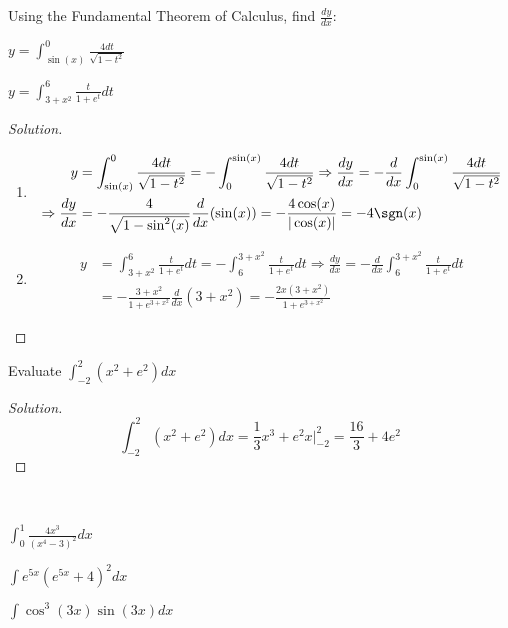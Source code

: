 \documentclass[crop=false,class=article,oneside]{standalone}
\begin{document}
        \begin{problem}
        Using the Fundamental Theorem of Calculus, find $\frac{dy}{dx}$:
        \begin{enumerate}
            \begin{multicols}{2}
                \item $y=\int_{\sin(x)}^{0}\frac{4dt}{\sqrt{1-t^{2}}}$
                \item $y=\int_{3+x^{2}}^{6}\frac{t}{1+e^{t}}dt$
            \end{multicols}
        \end{enumerate}
        \end{problem}
        \begin{proof}[Solution]
        \
        \begin{enumerate}
            \item   \begin{align*}
            y&=\int_{\sin(x)}^{0}\frac{4dt}{\sqrt{1-t^{2}}}=-\int_{0}^{\sin(x)}\frac{4dt}{\sqrt{1-t^{2}}}\Rightarrow\frac{dy}{dx}=-\frac{d}{dx}\int_{0}^{\sin(x)}\frac{4dt}{\sqrt{1-t^{2}}}\\
            \Rightarrow\frac{dy}{dx}&=-\frac{4}{\sqrt{1-\sin^{2}(x)}}\frac{d}{dx}(\sin(x))=-\frac{4\cos(x)}{|\cos(x)|}=-4\sgn(x)
                    \end{align*}
            \item   \begin{align*}
            y&=\int_{3+x^{2}}^{6}\frac{t}{1+e^{t}}dt=-\int_{6}^{3+x^{2}}\frac{t}{1+e^{t}}dt\Rightarrow\frac{dy}{dx}=-\frac{d}{dx}\int_{6}^{3+x^{2}}\frac{t}{1+e^{t}}dt\\
            &=-\frac{3+x^{2}}{1+e^{3+x^{2}}}\frac{d}{dx}(3+x^{2})=-\frac{2x(3+x^{2})}{1+e^{3+x^{2}}}
                    \end{align*}
        \end{enumerate}
        \end{proof}
        \newpage
        \begin{problem}
        Evaluate $\int_{-2}^{2}(x^{2}+e^{2})dx$
        \end{problem}
        \begin{proof}[Solution]
        \begin{equation*}
            \int_{-2}^{2}(x^{2}+e^{2})dx=\frac{1}{3}x^{3}+e^{2}x\big|_{-2}^{2}=\frac{16}{3}+4e^{2}
        \end{equation*}
        \end{proof}
        \begin{problem}
        \
        \begin{enumerate}
        \end{enumerate}
        \end{problem}
\end{document}
